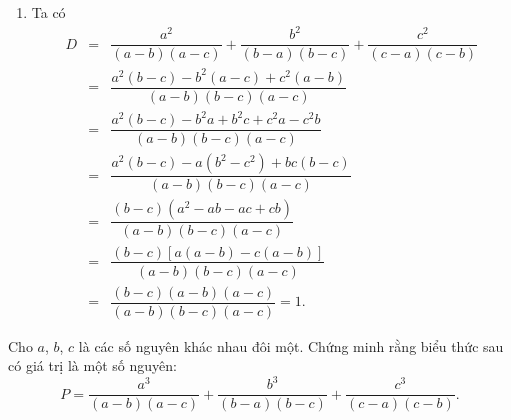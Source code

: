 \begin{bt}
{\begin{enumerate}
\begin{eqnarray*}
				&=& \dfrac{(a-b)(b-c)(a-c)}{(a-b)(b-c)(a-c)} = 1.
			\end{eqnarray*}
			\item Ta có
			\allowdisplaybreaks
			\begin{eqnarray*}
				D &=& \dfrac{a^2}{(a-b)(a-c)}+\dfrac{b^2}{(b-a)(b-c)}+\dfrac{c^2}{(c-a)(c-b)}\\
				&=& \dfrac{a^2(b-c)-b^2(a-c)+c^2(a-b)}{(a-b)(b-c)(a-c)}\\
				&=& \dfrac{a^2(b-c)-b^2a+b^2c+c^2a-c^2b}{(a-b)(b-c)(a-c)}\\
				&=& \dfrac{a^2(b-c)-a(b^2-c^2)+bc(b-c)}{(a-b)(b-c)(a-c)}\\
				&=& \dfrac{(b-c)(a^2-ab-ac+cb)}{(a-b)(b-c)(a-c)}\\
				&=& \dfrac{(b-c)\left[ a(a-b)-c(a-b)\right]}{(a-b)(b-c)(a-c)}\\
				&=& \dfrac{(b-c)(a-b)(a-c)}{(a-b)(b-c)(a-c)} = 1.
			\end{eqnarray*}
		\end{enumerate}
		
	}
\end{bt}

\begin{bt}%
	Cho $a$, $b$, $c$ là các số nguyên khác nhau đôi một. Chứng minh rằng biểu thức sau có giá trị là một số nguyên:
	$$P = \dfrac{a^3}{(a-b)(a-c)}+\dfrac{b^3}{(b-a)(b-c)}+\dfrac{c^3}{(c-a)(c-b)}.$$
\end{bt}

